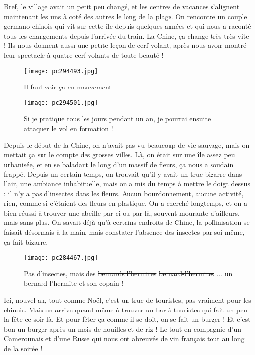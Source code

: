 \documentclass{book}
\begin{document}
Bref, le village avait un petit peu changé, et les centres de vacances s'alignent maintenant les uns à coté des autres le long de la plage. On rencontre un couple germano-chinois qui vit sur cette île depuis quelques années et qui nous a raconté tous les changements depuis l'arrivée du train. La Chine, ça change très très vite ! Ils nous donnent aussi une petite leçon de cerf-volant, après nous avoir montré leur spectacle à quatre cerf-volants de toute beauté !


\begin{figure}[h]
\centering
\texttt{[image: pc294493.jpg]}
\caption*{Il faut voir ça en mouvement...}
\end{figure}


\begin{figure}[h]
\centering
\texttt{[image: pc294501.jpg]}
\caption*{Si je pratique tous les jours pendant un an, je pourrai ensuite attaquer le vol en formation !}
\end{figure}

Depuis le début de la Chine, on n'avait pas vu beaucoup de vie sauvage, mais on mettait ça sur le compte des grosses villes. Là, on était sur une île assez peu urbanisée, et en se baladant le long d'un massif de fleurs, ça nous a soudain frappé. Depuis un certain temps, on trouvait qu'il y avait un truc bizarre dans l'air, une ambiance inhabituelle, mais on a mis du temps à mettre le doigt dessus : il n'y a pas d'insectes dans les fleurs. Aucun bourdonnement, aucune activité, rien, comme si c'étaient des fleurs en plastique. On a cherché longtemps, et on a bien réussi à trouver une abeille par ci ou par là, souvent mourante d'ailleurs, mais sans plus. On savait déjà qu'à certains endroits de Chine, la pollinisation se faisait désormais à la main, mais constater l'absence des insectes par soi-même, ça fait bizarre.


\begin{figure}[h]
\centering
\texttt{[image: pc284467.jpg]}
\caption*{Pas d'insectes, mais des \st{bernards l'hermites} \st{bernard-l'hermites} ... un bernard l'hermite et son copain !}
\end{figure}

Ici, nouvel an, tout comme Noël, c'est un truc de touristes, pas vraiment pour les chinois. Mais on arrive quand même à trouver un bar à touristes qui fait un peu la fête ce soir là. Et pour fêter ça comme il se doit, on se fait un burger ! Et c'est bon un burger après un mois de nouilles et de riz ! Le tout en compagnie d'un Camerounais et d'une Russe qui nous ont abreuvés de vin français tout au long de la soirée !
\end{document}
